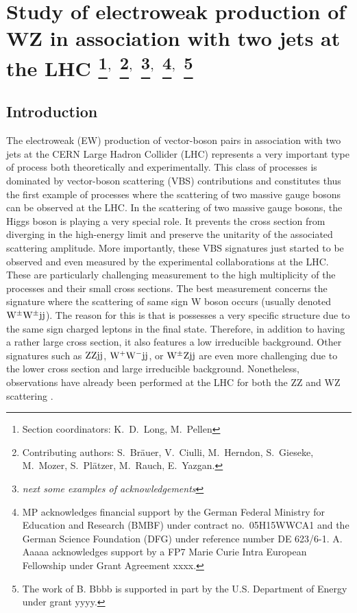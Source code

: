 \documentclass[11pt]{cernrep}
\newcommand{\MP}[1]{{ {\color{blue}{ [MP: #1]}} }}
\begin{document}
\section{Study of electroweak production of WZ in association with two
  jets at the LHC \protect\footnote{Section
    coordinators: K.~D.~Long, M.~Pellen}$^{,}$ \protect\footnote{Contributing authors:
    S.~Br\"auer, V.~Ciulli, M.~Herndon, S.~Gieseke, M.~Mozer, S.~Pl{\"a}tzer,
    M.~Rauch, E.~Yazgan.}$^{,}$
  \protect\footnote{{\it next some examples of acknowledgements}}$^{,}$
  \protect\footnote{MP acknowledges financial support by the
German Federal Ministry for Education and Research (BMBF) under
contract no.~05H15WWCA1 and the German Science Foundation (DFG) under
reference number DE 623/6-1. A. Aaaaa acknowledges support by a FP7 Marie
    Curie Intra European Fellowship under Grant Agreement xxxx.}$^{,}$
\protect\footnote{The work of B. Bbbb is supported in part by the
  U.S. Department of Energy under grant yyyy.} \label{vbs_section}}

\subsection{Introduction \label{vbs_intro}}

The electroweak (EW) production of vector-boson pairs in association with two jets at the CERN Large Hadron Collider (LHC) represents a very important type of process both theoretically and experimentally.
This class of processes is dominated by vector-boson scattering (VBS) contributions and constitutes thus the first example of processes where the scattering of two massive gauge bosons can be observed at the LHC.
In the scattering of two massive gauge bosons, the Higgs boson is playing a very special role.
It prevents the cross section from diverging in the high-energy limit and preserve the unitarity of the associated scattering amplitude.
More importantly, these VBS signatures just started to be observed and even measured by the experimental collaborations at the LHC.
These are particularly challenging measurement to the high multiplicity of the processes and their small cross sections.
The best measurement \cite{Aad:2014zda,Khachatryan:2014sta,Sirunyan:2017ret,Aaboud:2016ffv} concerns the signature where the scattering of same sign W boson occurs (usually denoted ${\rm W}^\pm{\rm W}^\pm{\rm j}{\rm j}$).
The reason for this is that is possesses a very specific structure due to the same sign charged leptons in the final state.
Therefore, in addition to having a rather large cross section, it also features a low irreducible background.
Other signatures such as ${\rm Z}{\rm Z}{\rm j}{\rm j}$, ${\rm W}^+{\rm W}^-{\rm j}{\rm j}$, or ${\rm W}^{\pm}{\rm Z}{\rm j}{\rm j}$ are even more challenging due to the lower cross section and large irreducible background.
Nonetheless, observations have already been performed at the LHC for both the ZZ \cite{Sirunyan:2017fvv} and WZ \cite{Aad:2016ett} scattering \MP{Experimental references to be added/modified.}.
\end{document}
